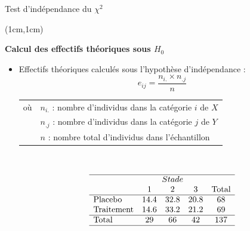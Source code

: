 \documentclass{beamer}
\begin{document}
\begin{frame}{Test d'indépendance du $\chi^2$}
\begin{textblock*}{\textwidth}(1cm,1cm)

\begin{center}{\bf \Large Calcul des effectifs théoriques sous $H_0$} \end{center}

\begin{itemize}
\item Effectifs théoriques calculés sous l'hypothèse d'indépendance : 
$$\displaystyle e_{ij} = \frac{n_{i.} \times n_{.j}}{n}$$
\begin{tabular}{ll}
où & $n_{i.}$ : nombre d'individus dans la catégorie $i$ de $X$  \\ %
& $n_{.j}$ : nombre d'individus dans la catégorie $j$ de $Y$ \\ %
& $n$ : nombre total d'individus dans l'échantillon \\ %
\end{tabular}

\

\small
$$
\begin{array}{lcccc}
\hline 
& \multicolumn{3}{c}{Stade} \\
& 1 & 2 & 3 & \mbox{Total} \\
\hline
\mbox{Placebo} & 14.4 & 32.8 & 20.8 & 68 \\
\mbox{Traitement} & 14.6 & 33.2 & 21.2 & 69 \\
\hline 
\mbox{Total} & 29 & 66 & 42 & 137 \\
\hline
\end{array}
$$


\end{itemize}
\end{textblock*}

\end{frame}


\end{document}
